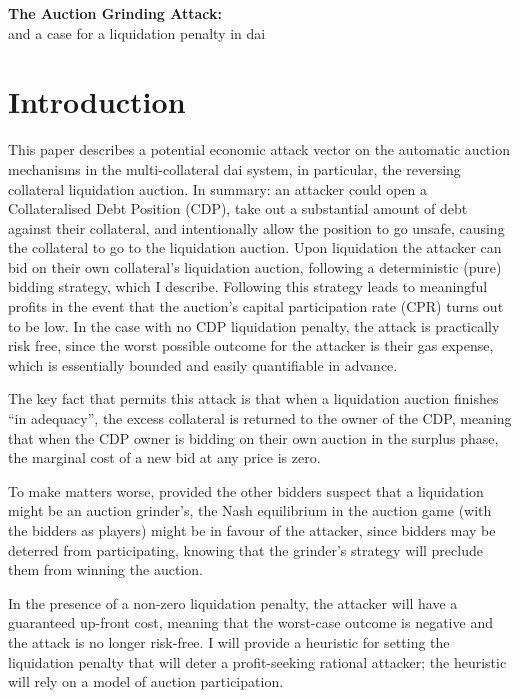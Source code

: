 \documentclass[a4paper,10pt]{article}
\begin{document}
\begin{center}{\LARGE\bf
    The Auction Grinding Attack:} \\
  and a case for a liquidation penalty in dai
 
\end{center}

\section{Introduction}
This paper describes a potential economic attack vector on the automatic auction mechanisms in the multi-collateral dai system, in particular, the reversing collateral liquidation auction. In summary: an attacker could open a Collateralised Debt Position (CDP), take out a substantial amount of debt against their collateral, and intentionally allow the position to go unsafe, causing the collateral to go to the liquidation auction. Upon liquidation the attacker can bid on their own collateral's liquidation auction, following a deterministic (pure) bidding strategy, which I describe. Following this strategy leads to meaningful profits in the event that the auction's capital participation rate (CPR) turns out to be low. In the case with no CDP liquidation penalty, the attack is practically risk free, since the worst possible outcome for the attacker is their gas expense, which is essentially bounded and easily quantifiable in advance.
\par The key fact that permits this attack is that when a liquidation auction finishes ``in adequacy'', the excess collateral is returned to the owner of the CDP, meaning that when the CDP owner is bidding on their own auction in the surplus phase, the marginal cost of a new bid at any price is zero.
\par To make matters worse, provided the other bidders suspect that a liquidation might be an auction grinder's, the Nash equilibrium in the auction game (with the bidders as players) might be in favour of the attacker, since bidders may be deterred from participating, knowing that the grinder's strategy will preclude them from winning the auction.
\par In the presence of a non-zero liquidation penalty, the attacker will have a guaranteed up-front cost, meaning that the worst-case outcome is negative and the attack is no longer risk-free. I will provide a heuristic for setting the liquidation penalty that will deter a profit-seeking rational attacker; the heuristic will rely on a model of auction participation.
\end{document}
